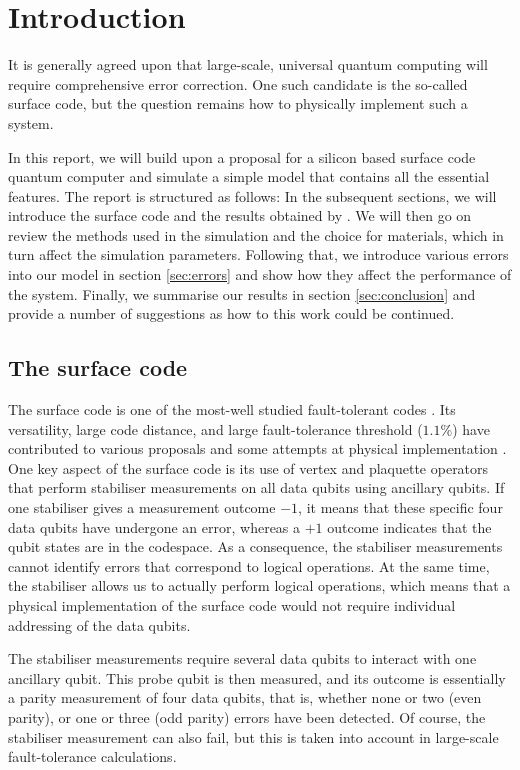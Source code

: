 \section{Introduction} \label{sec:Introduction}

It is generally agreed upon that large-scale, universal quantum computing will require comprehensive error correction. One such candidate is the so-called surface code, but the question remains how to physically implement such a system. 

In this report, we will build upon a proposal for a silicon based surface code quantum computer \cite{OGorman2016} and simulate a simple model that contains all the essential features. 
The report is structured as follows: In the subsequent sections, we will introduce the surface code and the results obtained by \citet{OGorman2016}. We will then go on review the methods used in the simulation and the choice for materials, which in turn affect the simulation parameters. Following that, we introduce various errors into our model in section \ref{sec:errors} and show how they affect the performance of the system. Finally, we summarise our results in section \ref{sec:conclusion} and provide a number of suggestions as how to this work could be continued. 

\subsection{The surface code}
The surface code is one of the most-well studied fault-tolerant codes \cite{Wang2011,Fowler2012}. Its versatility, large code distance, and large fault-tolerance threshold ($1.1\%$) have contributed to various proposals \cite{Fowler2012,Pica2014,Tosi2015,Hill2015,OGorman2016} and some attempts at physical implementation \cite{Barends2014,Kelly2015}. One key aspect of the surface code is its use of vertex and plaquette operators that perform stabiliser measurements on all data qubits using ancillary qubits. If one stabiliser gives a measurement outcome $-1$, it means that these specific four data qubits have undergone an error, whereas a $+1$ outcome indicates that the qubit states are in the codespace. As a consequence, the stabiliser measurements cannot identify errors that correspond to logical operations. At the same time, the stabiliser allows us to actually perform logical operations, which means that a physical implementation of the surface code would not require individual addressing of the data qubits. 

The stabiliser measurements require several data qubits to interact with one ancillary qubit. This probe qubit is then measured, and its outcome is essentially a parity measurement of four data qubits, that is, whether none or two  (even parity), or one or three (odd parity) errors have been detected. Of course, the stabiliser measurement can also fail, but this is taken into account in large-scale fault-tolerance calculations. 





